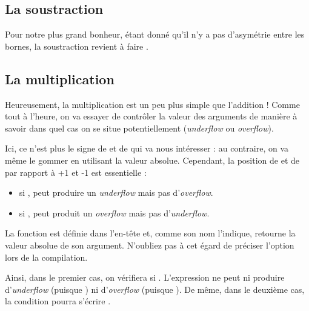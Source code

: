 \subsection{La soustraction}
\label{la-soustraction}

Pour notre plus grand bonheur, étant donné qu'il n'y a pas d'asymétrie
entre les bornes, la soustraction revient à faire
.

\subsection{La multiplication}
\label{la-multiplication}

Heureusement, la multiplication est un peu plus simple que l'addition !
Comme tout à l'heure, on va essayer de contrôler la valeur des arguments
de manière à savoir dans quel cas on se situe potentiellement
(\emph{underflow} ou \emph{overflow}).

Ici, ce n'est plus le signe de  et de  qui va nous
intéresser : au contraire, on va même le gommer en utilisant la valeur
absolue. Cependant, la position de  et de  par
rapport à +1 et -1 est essentielle :

\begin{itemize}
\item
  si ,  peut produire
  un \emph{underflow} mais pas d'\emph{overflow}.
\item
  si ,  peut produit
  un \emph{overflow} mais pas d'\emph{underflow}.
\end{itemize}

\begin{infobox}
  La fonction  est
définie dans l'en-tête  et,
comme son nom l'indique, retourne la valeur absolue de son argument.
N'oubliez pas à cet égard de préciser l'option  lors de la
compilation.
\end{infobox}


Ainsi, dans le premier cas, on vérifiera si
. L'expression
 ne peut ni produire d'\emph{underflow}
(puisque ) ni d'\emph{overflow}
(puisque ). De même, dans le
deuxième cas, la condition pourra s'écrire
.

